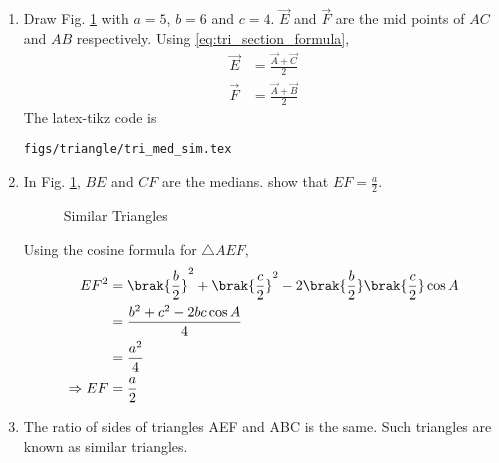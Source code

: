 %
\renewcommand{\theequation}{\theenumi}
\begin{enumerate}[label=\arabic*.,ref=\thesubsection.\theenumi]

%
%
%
%

\item Draw Fig. \ref{fig:tri_med_sim}	 with $a=5$, $b=6$  and $c=4$.  $\vec{E}$ and $\vec{F}$ are the mid points of $AC$ and $AB$ respectively.
\label{const:tri_median_def}
\solution Using \eqref{eq:tri_section_formula}, 
\begin{align}
\vec{E} &= \frac{\vec{A} + \vec{C}}{2}  
\\
\vec{F} &= \frac{\vec{A} + \vec{B}}{2}  
\end{align}
%
The  latex-tikz code is
%
\begin{lstlisting}
figs/triangle/tri_med_sim.tex
\end{lstlisting}
\item
	In Fig. \ref{fig:tri_med_sim}, $BE$ and $CF$ are the medians.  show that $EF = \frac{a}{2}$.  

%
\begin{figure}[!ht]
	\begin{center}
		\resizebox{\columnwidth}{!}{}
	\end{center}
	\caption{Similar Triangles}
	\label{fig:tri_med_sim}	
\end{figure}

\solution Using the cosine formula for $\triangle AEF$,
%
\begin{align}
EF^2 &= \brak{\frac{b}{2}}^2 + \brak{\frac{c}{2}}^2 - 2 \brak{\frac{b}{2}}\brak{\frac{c}{2}} \cos A \\
&= \frac{b^2 + c^2 - 2bc \cos A}{4} \\
&= \frac{a^2}{4} \\
\Rightarrow EF &= \frac{a}{2}
\end{align}
%

\item
	The ratio of sides of triangles AEF and ABC is the same.  Such triangles are known as similar triangles.


\end{enumerate}

